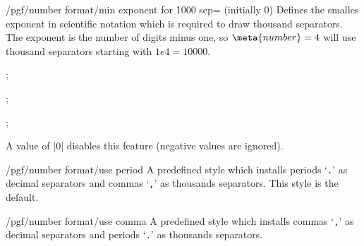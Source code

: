 \begin{key}{/pgf/number format/min exponent for 1000 sep= (initially 0)}
	Defines the smalles exponent in scientific notation which is required to draw thousand separators. The exponent is the number of digits minus one, so $\meta{number}=4$ will use thousand separators starting with $1e4 = 10000$.
\begin{codeexample}[]
; 
\end{codeexample}

\begin{codeexample}[]
; 
\end{codeexample}
\begin{codeexample}[]
; 
\end{codeexample}
\noindent A value of |0| disables this feature (negative values are ignored).
\end{key}


\begin{key}{/pgf/number format/use period}
A predefined style which installs periods `\texttt{.}' as decimal separators and commas `\texttt{,}' as thousands separators. This style is the default.

\begin{codeexample}[]
\end{codeexample}
\begin{codeexample}[]
\end{codeexample}
\end{key}

\begin{key}{/pgf/number format/use comma}
A predefined style which installs commas `\texttt{,}' as decimal separators and periods `\texttt{.}' as thousands separators.

\begin{codeexample}[]
\end{codeexample}
\begin{codeexample}[]
\end{codeexample}
\end{key}


